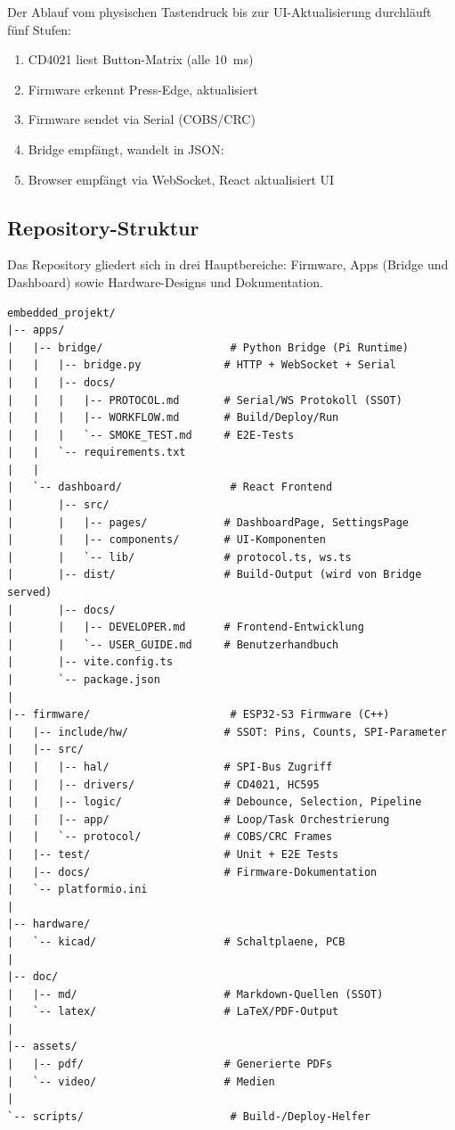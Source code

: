 Der Ablauf vom physischen Tastendruck bis zur UI-Aktualisierung durchläuft fünf Stufen:

\begin{enumerate}
  \item CD4021 liest Button-Matrix (alle \SI{10}{\milli\second})
  \item Firmware erkennt Press-Edge, aktualisiert 
  \item Firmware sendet  via Serial (COBS/CRC)
  \item Bridge empfängt, wandelt in JSON: 
  \item Browser empfängt via WebSocket, React aktualisiert UI
\end{enumerate}

\subsection{Repository-Struktur}
\label{subsec:repo-struktur}

Das Repository gliedert sich in drei Hauptbereiche: Firmware, Apps (Bridge und Dashboard)
sowie Hardware-Designs und Dokumentation.

\begin{lstlisting}[style=shell, caption={Repository-Struktur}, label={lst:repo-struktur}]
embedded_projekt/
|-- apps/
|   |-- bridge/                    # Python Bridge (Pi Runtime)
|   |   |-- bridge.py             # HTTP + WebSocket + Serial
|   |   |-- docs/
|   |   |   |-- PROTOCOL.md       # Serial/WS Protokoll (SSOT)
|   |   |   |-- WORKFLOW.md       # Build/Deploy/Run
|   |   |   `-- SMOKE_TEST.md     # E2E-Tests
|   |   `-- requirements.txt
|   |
|   `-- dashboard/                 # React Frontend
|       |-- src/
|       |   |-- pages/            # DashboardPage, SettingsPage
|       |   |-- components/       # UI-Komponenten
|       |   `-- lib/              # protocol.ts, ws.ts
|       |-- dist/                 # Build-Output (wird von Bridge served)
|       |-- docs/
|       |   |-- DEVELOPER.md      # Frontend-Entwicklung
|       |   `-- USER_GUIDE.md     # Benutzerhandbuch
|       |-- vite.config.ts
|       `-- package.json
|
|-- firmware/                      # ESP32-S3 Firmware (C++)
|   |-- include/hw/               # SSOT: Pins, Counts, SPI-Parameter
|   |-- src/
|   |   |-- hal/                  # SPI-Bus Zugriff
|   |   |-- drivers/              # CD4021, HC595
|   |   |-- logic/                # Debounce, Selection, Pipeline
|   |   |-- app/                  # Loop/Task Orchestrierung
|   |   `-- protocol/             # COBS/CRC Frames
|   |-- test/                     # Unit + E2E Tests
|   |-- docs/                     # Firmware-Dokumentation
|   `-- platformio.ini
|
|-- hardware/
|   `-- kicad/                    # Schaltplaene, PCB
|
|-- doc/
|   |-- md/                       # Markdown-Quellen (SSOT)
|   `-- latex/                    # LaTeX/PDF-Output
|
|-- assets/
|   |-- pdf/                      # Generierte PDFs
|   `-- video/                    # Medien
|
`-- scripts/                       # Build-/Deploy-Helfer
\end{lstlisting}

